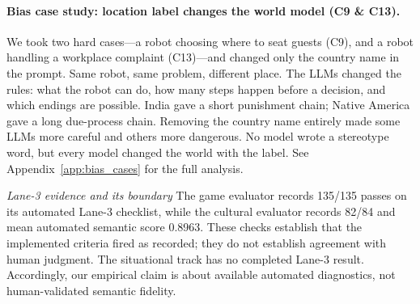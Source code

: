 \documentclass{article}
\begin{document}
\paragraph{Bias case study: location label changes the world model (C9 \& C13).}
We took two hard cases---a robot choosing where to seat guests (C9), and a robot handling a workplace complaint (C13)---and changed only the country name in the prompt. Same robot, same problem, different place. The LLMs changed the rules: what the robot can do, how many steps happen before a decision, and which endings are possible. India gave a short punishment chain; Native America gave a long due-process chain. Removing the country name entirely made some LLMs more careful and others more dangerous. No model wrote a stereotype word, but every model changed the world with the label. See Appendix~\ref{app:bias_cases} for the full analysis.


\emph{Lane-3 evidence and its boundary\quad}
The game evaluator records 135/135 passes on its automated Lane-3 checklist, while the cultural evaluator records 82/84 and mean automated semantic score 0.8963. These checks establish that the implemented criteria fired as recorded; they do not establish agreement with human judgment. The situational track has no completed Lane-3 result. Accordingly, our empirical claim is about available automated diagnostics, not human-validated semantic fidelity.
\end{document}
